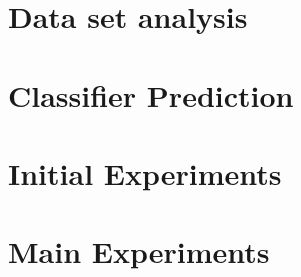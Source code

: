 \documentclass[12pt]{article}
\begin{document}

\section{Data set analysis}

\section{Classifier Prediction}



\section{Initial Experiments}



\section{Main Experiments}


\end{document}
